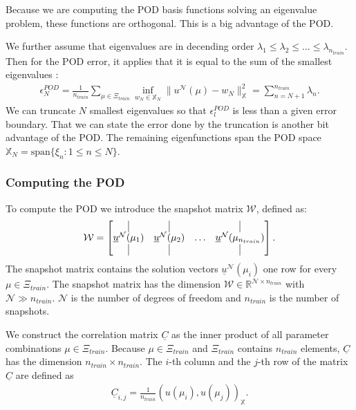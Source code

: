 Because we are computing the POD basis functions solving an eigenvalue problem, these functions are orthogonal. This is a big advantage of the POD.

We further assume that eigenvalues are in decending order $\lambda_1 \leq \lambda_2 \leq \hdots \leq \lambda_{n_{train}}$.
Then for the POD error, it applies that it is equal to the sum of the smallest eigenvalues \cite{GalerkingPOD}:
\begin{align}
\label{eq:PODerror}
\epsilon_N^{POD}
=
\frac{1}{n_{train}}
\sum_{ \mu \in \Xi_{train} }   
\inf_{ w_N \in \mathbb{X}_N } \| u^\mathcal{N}(\mu) - w_N \|_\mathbb{X}^2 
=
\sum_{n=N+1}^{n_{train}}\lambda_{n}.
\end{align}
We can truncate $N$ smallest eigenvalues so that $\epsilon_l^{POD}$ is less than a given error boundary.
That we can state the error done by the truncation is another bit advantage of the POD.
The remaining eigenfunctions span the POD space $\mathbb{X}_{N} = \text{span} \{\xi_n: 1\leq n \leq N \} $.

\subsubsection{Computing the POD}
\label{sec:ComputePOD}

To compute the POD we introduce the snapshot matrix $\mathcal{W}$, defined as:
\begin{align*}
\mathcal{W} = 
\begin{bmatrix} 
\vline & \vline & & \vline\\ 
\underline{u}^{\mathcal{ N }}(\mu_{1}) & \underline{u}^{\mathcal{ N }}(\mu_{2}) & \hdots & \underline{u}^{\mathcal{ N }}(\mu_{n_{train}})  \\
\vline & \vline & & \vline 
\end{bmatrix}.
\end{align*} 
The snapshot matrix contains the solution vectors $\underline{u}^{\mathcal{ N }}(\mu_{i})$ one row for every $\mu \in  \Xi_{train}$. 
The snapshot matrix has the dimension $\mathcal{W} \in \mathbb{R}^{\mathcal{ N } \times n_{train}}$ with $\mathcal{ N } \gg n_{train}$.
$\mathcal{ N }$ is the number of degrees of freedom and $n_{train}$ is the number of snapshots. 

We construct the correlation matrix $\underline{C}$ as the inner product of all parameter combinations  $\mu \in \Xi_{train}$. Because $\mu \in \Xi_{train}$ and $\Xi_{train}$ contains $n_{train}$ elements,  $\underline{C}$  has the dimension $n_{train} \times n_{train}$.
The $i$-th column and the $j$-th row of the matrix $\underline{C}$ are defined as
\begin{align}
\label{eq:corrMatrix}
\underline{C}_{i,j} = \frac{1}{n_{train}} (u(\mu_{i}),u(\mu_{j}))_\mathbb{X}.
\end{align}

